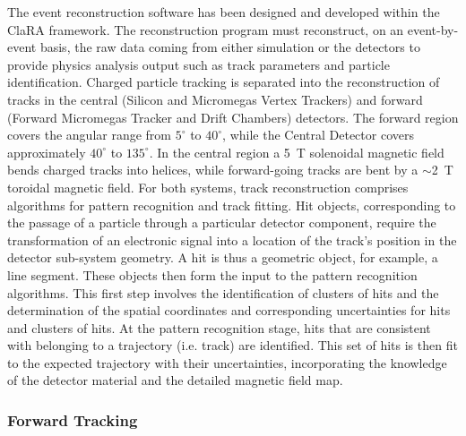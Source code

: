 \documentclass{elsart}
\begin{document}
The event reconstruction software has been designed and developed within the ClaRA framework. The
reconstruction program must reconstruct, on an event-by-event basis, the raw data coming from either
simulation or the detectors to provide physics analysis output such as track parameters and particle
identification. Charged particle tracking is separated into the reconstruction of tracks in the central
(Silicon and Micromegas Vertex Trackers) and forward (Forward Micromegas Tracker and Drift
Chambers) detectors. The forward region covers the angular range from $5^\circ$ to $40^\circ$, while
the Central Detector covers approximately $40^\circ$ to $135^\circ$. In the central region a 5~T
solenoidal magnetic field bends charged tracks into helices, while forward-going tracks are bent by a
$\sim$2~T toroidal magnetic field. For both systems, track reconstruction comprises algorithms for
pattern recognition and track fitting. Hit objects, corresponding to the passage of a particle through a
particular detector component, require the transformation of an electronic signal into a location of the
track's position in the detector sub-system geometry. A hit is thus a geometric object, for example, a
line segment. These objects then form the input to the pattern recognition algorithms. This first step
involves the identification of clusters of hits and the determination of the spatial coordinates and
corresponding uncertainties for hits and clusters of hits. At the pattern recognition stage, hits that are
consistent with belonging to a trajectory (i.e. track) are identified. This set of hits is then fit to the
expected trajectory with their uncertainties, incorporating the knowledge of the detector material and
the detailed magnetic field map.

\subsubsection{Forward Tracking}
\end{document}
